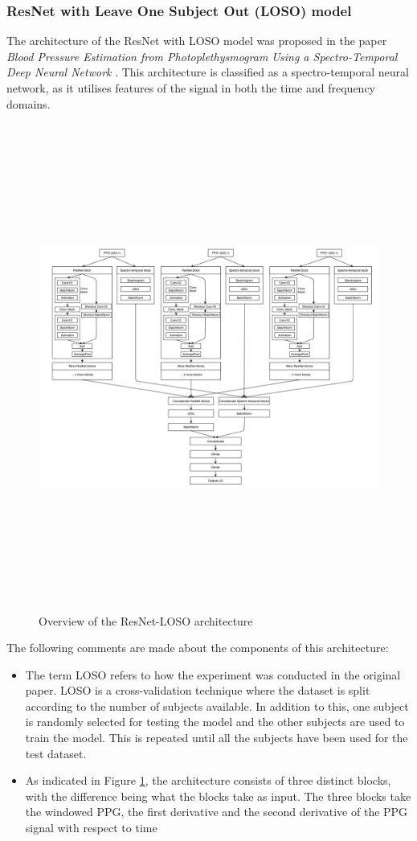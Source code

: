 \subsubsection{ResNet with Leave One Subject Out (LOSO) model}
The architecture of the ResNet with LOSO model was proposed in the paper \emph{Blood Pressure Estimation from Photoplethysmogram Using a Spectro-Temporal Deep Neural Network} \cite{slapnicar2019}. This architecture is classified as 
a spectro-temporal neural network, as it utilises features of the signal in both the time and frequency domains. 
\begin{figure}[H]
    \centering
    \includegraphics[width=16cm,height=16cm,keepaspectratio]{Implementation/slapnicar.png}
    \caption{Overview of the ResNet-LOSO architecture \cite{slapnicar2019}}
    \label{slapnicarArch}
\end{figure}\noindent The following comments are made about the components of this architecture:
\begin{itemize}
    \item The term LOSO refers to how the experiment was conducted in the original paper. LOSO is a cross-validation technique where the dataset is split according to the number of subjects available. In addition to this, one subject is randomly selected for testing the model and the other subjects are used to train the model. This is repeated until all the subjects have been used for the test dataset.
    \item As indicated in Figure \ref{slapnicarArch}, the architecture consists of three distinct blocks, with the difference being what the blocks take as input. The three blocks take the windowed PPG, the first derivative and the second derivative of the PPG signal with respect to time
\end{itemize}


